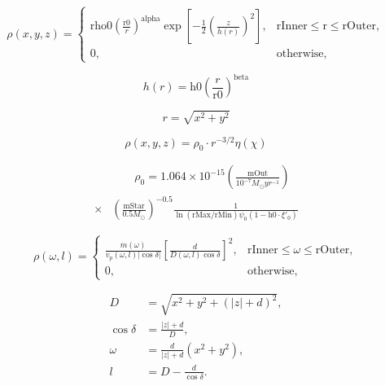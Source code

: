 \documentclass[a4paper,14pt]{extarticle}
\begin{document}
\begin{equation*}
\rho(\mathit{x},\mathit{y},\mathit{z}) = \begin{cases}
               \mathrm{rho0} \left(\frac{\mathrm{r0}}{r}\right)^\mathrm{alpha} \exp\left[-\frac{1}{2}\left(\frac{ \mathit{z}}{h(r)}\right)^2\right],       &  \mathrm{rInner} \le \mathrm{r} \le  \mathrm{rOuter}, \\
               0,& \text{otherwise},          \end{cases}
\end{equation*}

\begin{equation*}
 h(r)=\mathrm{h0}\left(\frac{r}{\mathrm{r0}}\right)^\mathrm{beta}
\end{equation*}

\begin{equation*}
 r=\sqrt{\mathit{x}^2+\mathit{y}^2}
\end{equation*}

\begin{equation*}
 \rho(\mathit{x},\mathit{y},\mathit{z}) = \rho_0 \cdot r^{-3/2}\eta(\chi)
\end{equation*}

\begin{equation*}\begin{split}
  &\qquad \rho_0= 1.064 \times 10^{-15}\left( \frac{\mathrm{mOut}}{10^{-7}M_\odot yr^{-1}}\right)\\
 \times&\left(  \frac{\mathrm{mStar}}{0.5M_\odot}\right)^{-0.5} \frac{1}{\ln (\mathrm{rMax}/\mathrm{rMin}) \psi_0 (1 - \mathrm{h0}\cdot\xi'_0)}
\end{split}\end{equation*}

\begin{equation*}
  \rho(\omega, l)= \begin{cases} \frac{\dot{m}(\omega)}{v_p(\omega, l) |\cos \delta|}\left[ \frac{d}{D(\omega, l) \cos\delta}\right]^2,       &  \mathrm{rInner} \le \omega \le  \mathrm{rOuter}, \\
               0,& \text{otherwise},          \end{cases}
\end{equation*}

\begin{equation*}\begin{split}
  D &=  \sqrt{x^2+y^2+(|z| + d)^2},\\
  \cos\delta &= \frac{|z| + d}{D},\\
  \omega &= \frac{d}{|z| + d}(x^2 + y^2),\\  
  l &= D - \frac{d}{\cos\delta}.
\end{split}\end{equation*}
\end{document}
